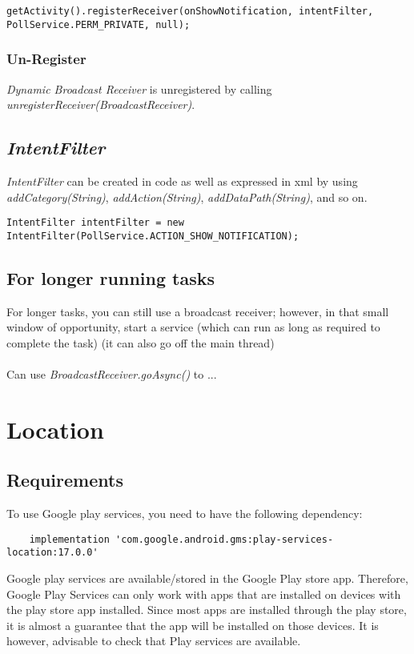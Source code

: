 \documentclass[]{article}
\renewcommand{\it}[1]{\textit{#1}}
\begin{document}
\begin{lstlisting}
getActivity().registerReceiver(onShowNotification, intentFilter, PollService.PERM_PRIVATE, null);
\end{lstlisting}

\subsubsection{Un-Register}
\it{Dynamic Broadcast Receiver} is unregistered by calling \it{unregisterReceiver(BroadcastReceiver)}.

\subsection{\it{IntentFilter}}
\it{IntentFilter} can be created in code as well as expressed in xml by using \it{addCategory(String)}, \it{addAction(String)}, \it{addDataPath(String)}, and so on.
\begin{lstlisting}
IntentFilter intentFilter = new IntentFilter(PollService.ACTION_SHOW_NOTIFICATION);
\end{lstlisting}

\subsection{For longer running tasks}
For longer tasks, you can still use a broadcast receiver; however, in that small window of opportunity, start a service (which can run as long as required to complete the task) (it can also go off the main thread)
\\\\
Can use \it{BroadcastReceiver.goAsync()} to ...

\section{Location}
\subsection{Requirements}
To use Google play services, you need to have the following dependency:
\begin{lstlisting}
    implementation 'com.google.android.gms:play-services-location:17.0.0'
\end{lstlisting}
Google play services are available/stored in the Google Play store app.  Therefore, Google Play Services can only work with apps that are installed on devices with the play store app installed.  Since most apps are installed through the play store, it is almost a guarantee that the app will be installed on those devices.  It is however, advisable to check that Play services are available.
\end{document}
